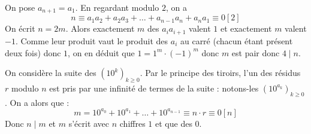 \begin{sol}
On pose $a_{n+1}=a_1$.
En regardant modulo $2$, on a $$n\equiv a_1a_2+a_2a_3+\dots+a_{n-1}a_n+a_na_1\equiv 0[2]$$
On écrit $n=2m$. Alors exactement $m$ des $a_ia_{i+1}$ valent $1$ et exactement $m$ valent $-1$.
Comme leur produit vaut le produit des $a_i$ au carré (chacun étant présent deux fois) donc $1$, on en déduit que $1=1^m\cdot(-1)^m$ donc $m$ est pair donc $4\mid n$.
\end{sol}


\begin{sol}
On considère la suite des $(10^k)_{k\ge0}$. Par le principe des tiroirs, l'un des résidus $r$ modulo $n$ est pris par une infinité de termes de la suite : notons-les $(10^{a_k})_{k\ge0}$. On a alors que : $$m=10^{a_0}+10^{a_1}+\dots+10^{a_{n-1}}\equiv n\cdot r\equiv0[n]$$
Donc $n\mid m$ et $m$ s'écrit avec $n$ chiffres $1$ et que des $0$.
\end{sol}
